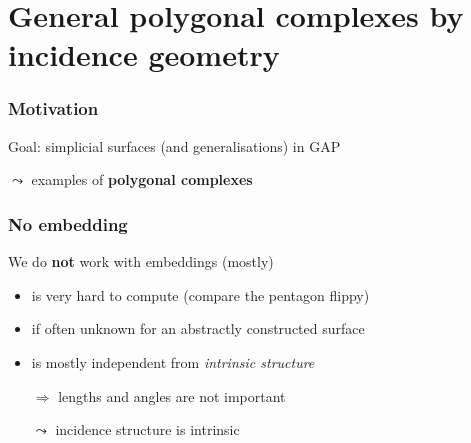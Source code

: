 \section{General polygonal complexes by incidence geometry}
\frame{\tableofcontents[currentsection]}

\begin{frame}
    \frametitle{Motivation}
    \pause
    Goal: simplicial surfaces (and generalisations) in GAP
    \pause
    \begin{center}
        
    \end{center}
    \pause
    $\leadsto$ examples of \textbf{polygonal complexes}
\end{frame}

\begin{frame}
    \frametitle{No embedding}
    \pause
    We do \textbf{not} work with embeddings (mostly)
    \begin{itemize}
        \pause
        \item is very hard to compute \pause (compare the pentagon flippy)
        \pause
        \item if often unknown for an abstractly constructed surface
        \pause
        \item is mostly independent from \textit{intrinsic structure}
        \pause
        \item[$\Rightarrow$] lengths and angles are not important
        \pause
        \item[$\leadsto$] incidence structure is intrinsic
    \end{itemize}
\end{frame}

